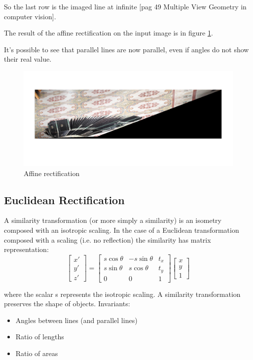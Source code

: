 \documentclass[11pt, oneside]{article}   	%
\begin{document}
So the last row is the imaged line at infinite [pag 49 Multiple View Geometry in computer vision].

The result of the affine rectification on the input image is in figure  {\ref{affine}}.

It's possible to see that parallel lines are now parallel, even if angles do not show their real value.

\begin{figure}
\includegraphics[width=0.8\linewidth]{rectified_img.jpg}
\caption{Affine rectification}
\label{affine}
\end{figure}

\subsection{Euclidean Rectification}
A similarity transformation (or more simply a similarity) is an isometry composed with an isotropic scaling. In the case of a Euclidean transformation composed with a scaling (i.e. no reflection) the similarity has matrix representation:
\begin{equation}
\begin{bmatrix}
x' \\ y' \\ z'
\end{bmatrix}
=
\begin{bmatrix}
s \cos\theta & - s \sin\theta & t_x \\ s \sin\theta & s \cos\theta & t_y \\ 0 & 0 & 1
\end{bmatrix}
\begin{bmatrix}
x \\ y \\ 1
\end{bmatrix}
\end{equation}

where the scalar s represents the isotropic scaling.
A similarity transformation preserves the shape of objects.
Invariants:
\begin{itemize}
\item Angles between lines (and parallel lines)
\item Ratio of lengths
\item Ratio of areas
\end{itemize}
\end{document}
